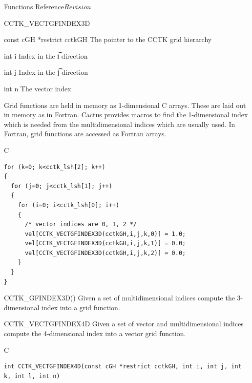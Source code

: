 \begin{cactuspart}{ Functions Reference}{}{$Revision$}
\begin{FunctionDescription}{CCTK\_VECTGFINDEX3D}
\begin{ParameterSection}
\begin{Parameter} {const cGH *restrict cctkGH}
The pointer to the CCTK grid hierarchy
\end{Parameter}

\begin{Parameter} {int i}
Index in the \t{i} direction
\end{Parameter}

\begin{Parameter} {int j}
Index in the \t{j} direction
\end{Parameter}

\begin{Parameter} {int n}
The vector index
\end{Parameter}
\end{ParameterSection}

\begin{Discussion}
Grid functions are held in memory as 1-dimensional C arrays. These are
laid out in memory as in Fortran. Cactus provides macros to find the
1-dimensional index which is needed from the multidimensional indices which
are usually used. In Fortran, grid functions are accessed as Fortran arrays.
\end{Discussion}
\begin{ExampleSection}
\begin{Example}{C}
\begin{verbatim}
for (k=0; k<cctk_lsh[2]; k++)
{
  for (j=0; j<cctk_lsh[1]; j++)
  {
    for (i=0; i<cctk_lsh[0]; i++)
    {
      /* vector indices are 0, 1, 2 */
      vel[CCTK_VECTGFINDEX3D(cctkGH,i,j,k,0)] = 1.0;
      vel[CCTK_VECTGFINDEX3D(cctkGH,i,j,k,1)] = 0.0;
      vel[CCTK_VECTGFINDEX3D(cctkGH,i,j,k,2)] = 0.0;
    }
  }
}
\end{verbatim}
\end{Example}
\end{ExampleSection}
\begin{SeeAlsoSection}
\begin{SeeAlso}{CCTK\_GFINDEX3D()}
Given a set of multidimensional indices compute the 3-dimensional index into a
grid function.
\end{SeeAlso}

\end{SeeAlsoSection}
\end{FunctionDescription}



\begin{FunctionDescription}{CCTK\_VECTGFINDEX4D}
\label{CCTK-VECTGFINDEX4D}
Given a set of vector and multidimensional indices compute the 4-dimensional
index into a vector grid function.
\begin{SynopsisSection}
\begin{Synopsis}{C}
\begin{verbatim}
int CCTK_VECTGFINDEX4D(const cGH *restrict cctkGH, int i, int j, int k, int l, int n)
\end{verbatim}
\end{Synopsis}
\end{SynopsisSection}


\end{FunctionDescription}
\end{cactuspart}
